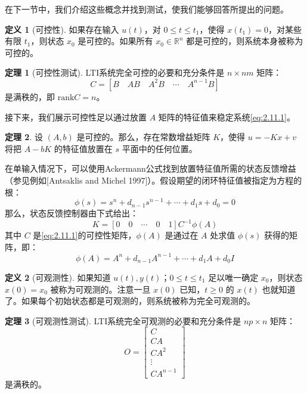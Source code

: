 \documentclass[UTF8,12pt,a4paper]{ctexart}
\theoremstyle{definition}
\newtheorem{definition}{定义}[section]
\newtheorem{theorem}{定理}[section]
\begin{document}
在下一节中，我们介绍这些概念并找到测试，使我们能够回答所提出的问题。

\begin{definition}[可控性]
如果存在输入 $u(t)$，对 $0 \leq t \leq t_1$，使得 $x(t_1)=0$，对某些有限 $t_1$，则状态 $x_0$ 是可控的。如果所有 $x_0 \in \mathbb{R}^n$ 都是可控的，则系统本身被称为可控的。
\end{definition}

\begin{theorem}[可控性测试]
LTI系统完全可控的必要和充分条件是 $n \times nm$ 矩阵：
\[
C = [B \quad AB \quad A^2B \quad \cdots \quad A^{n-1}B]
\]
是满秩的，即 $\text{rank} C = n$。
\end{theorem}

接下来，我们展示可控性足以通过放置 $A$ 矩阵的特征值来稳定系统\eqref{eq:2.11.1}。

\begin{theorem}
设 $(A, b)$ 是可控的。那么，存在常数增益矩阵 $K$，使得 $u=-Kx+v$ 将把 $A-bK$ 的特征值放置在 $s$ 平面中的任何位置。
\end{theorem}

在单输入情况下，可以使用Ackermann公式找到放置特征值所需的状态反馈增益（参见例如[Antsaklis and Michel 1997]）。假设期望的闭环特征值被指定为方程的根：
\begin{equation}\label{eq:2.11.3}
\phi(s) = s^n + d_{n-1}s^{n-1} + \cdots + d_1 s + d_0 = 0
\end{equation}
那么，状态反馈控制器由下式给出：
\begin{equation}\label{eq:2.11.4}
K = [0 \quad 0 \quad \cdots \quad 0 \quad 1]C^{-1}\phi(A)
\end{equation}
其中 $C$ 是\eqref{eq:2.11.1}的可控性矩阵，$\phi(A)$ 是通过在 $A$ 处求值 $\phi(s)$ 获得的矩阵，即：
\begin{equation}\label{eq:2.11.5}
\phi(A) = A^n + d_{n-1}A^{n-1} + \cdots + d_1 A + d_0 I
\end{equation}

\begin{definition}[可观测性]
如果知道 $u(t), y(t)$；$0 \leq t \leq t_1$ 足以唯一确定 $x_0$，则状态 $x(0)=x_0$ 被称为可观测的。注意一旦 $x(0)$ 已知，$t \geq 0$ 的 $x(t)$ 也就知道了。如果每个初始状态都是可观测的，则系统被称为完全可观测的。
\end{definition}

\begin{theorem}[可观测性测试]
LTI系统完全可观测的必要和充分条件是 $np \times n$ 矩阵：
\[
O = \begin{bmatrix} C \\ CA \\ CA^2 \\ \vdots \\ CA^{n-1} \end{bmatrix}
\]
是满秩的。
\end{theorem}
\end{document}
